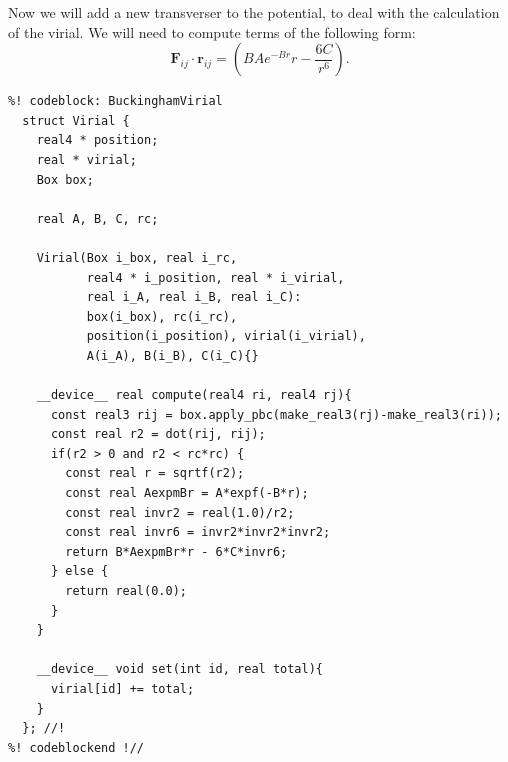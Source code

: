 Now we will add a new transverser to the potential, to deal with the calculation 
of the virial. We will need to compute terms of the following form:
\begin{equation*}
  \mathbf{F}_{ij} \cdot \mathbf{r}_{ij}
    = \left(BAe^{-Br}r - \frac{6C}{r^6}\right).
\end{equation*}
\begin{lstlisting}
%! codeblock: BuckinghamVirial
  struct Virial {
    real4 * position;
    real * virial;
    Box box;

    real A, B, C, rc;

    Virial(Box i_box, real i_rc,
           real4 * i_position, real * i_virial,
           real i_A, real i_B, real i_C):
           box(i_box), rc(i_rc),
           position(i_position), virial(i_virial),
           A(i_A), B(i_B), C(i_C){}

    __device__ real compute(real4 ri, real4 rj){
      const real3 rij = box.apply_pbc(make_real3(rj)-make_real3(ri));
      const real r2 = dot(rij, rij);
      if(r2 > 0 and r2 < rc*rc) {
        const real r = sqrtf(r2);
        const real AexpmBr = A*expf(-B*r);
        const real invr2 = real(1.0)/r2;
        const real invr6 = invr2*invr2*invr2;
        return B*AexpmBr*r - 6*C*invr6;
      } else {
        return real(0.0);
      }
    }

    __device__ void set(int id, real total){
      virial[id] += total;
    }
  }; //!
%! codeblockend !//
\end{lstlisting}

